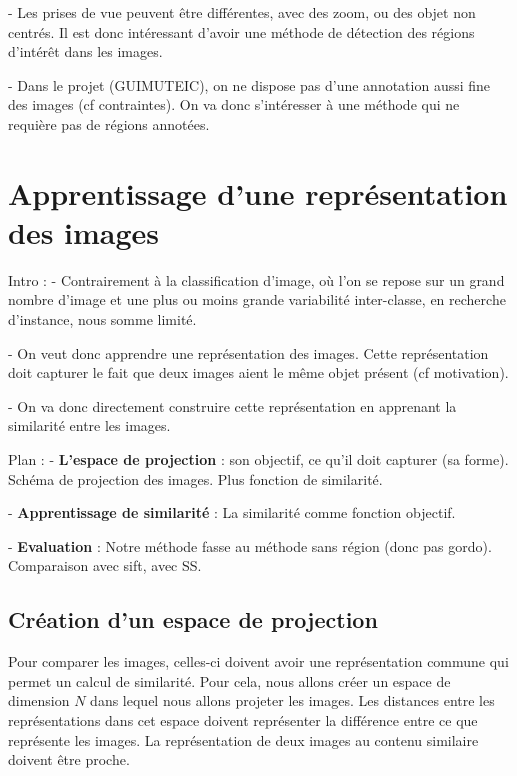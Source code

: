  - Les prises de vue peuvent être différentes, avec des zoom, ou des objet non centrés. Il est donc intéressant d'avoir une méthode de détection des régions d'intérêt dans les images.
 
 - Dans le projet (GUIMUTEIC), on ne dispose pas d'une annotation aussi fine des images (cf contraintes). On va donc s'intéresser à une méthode qui ne requière pas de régions annotées.




\section{Apprentissage d'une représentation des images}
\label{sec:similarite}

Intro : 
 - Contrairement à la classification d'image, où l'on se repose sur un grand nombre d'image et une plus ou moins grande variabilité inter-classe, en recherche d'instance, nous somme limité.
 
 - On veut donc apprendre une représentation des images. Cette représentation doit capturer le fait que deux images aient le même objet présent (cf motivation).
 
 - On va donc directement construire cette représentation en apprenant la similarité entre les images.
 

Plan :
 - \textbf{L'espace de projection} : son objectif, ce qu'il doit capturer (sa forme). Schéma de projection des images. Plus fonction de similarité.
 
 -\textbf{ Apprentissage de similarité }: La similarité comme fonction objectif.
 
 - \textbf{Evaluation} : Notre méthode fasse au méthode sans région (donc pas gordo). Comparaison avec sift, avec SS. 
 
 
\subsection{Création d'un espace de projection}

Pour comparer les images, celles-ci doivent avoir une représentation commune qui permet un calcul de similarité.
Pour cela, nous allons créer un espace de dimension $N$ dans lequel nous allons projeter les images.
Les distances entre les représentations dans cet espace doivent représenter la différence entre ce que représente les images.
La représentation de deux images au contenu similaire doivent être proche.


